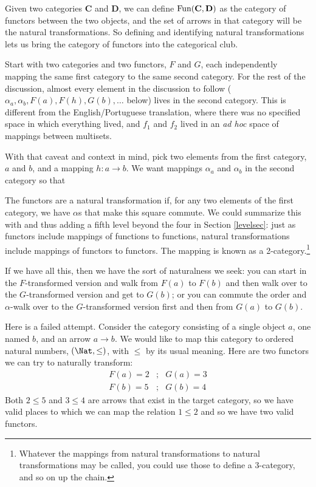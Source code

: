 \documentclass[11pt]{article}
\begin{document}
Given two categories {\bf C} and {\bf D}, we can define ${\rm Fun}({\bf C}, {\bf D})$ as
the category of functors between the two objects, and the set of arrows in that category
will be the natural transformations. So defining and identifying natural
transformations lets us bring the category of functors into the categorical club.

Start with two categories and two functors, $F$ and $G$, each independently mapping the same first
category to the same second category. For the rest of the discussion, almost every element in the discussion
to follow ($\alpha_a, \alpha_b, F(a), F(h), G(b), \dots$ below) lives in the second category.
This is different from the English/Portuguese translation, where there was no specified
space in which everything lived, and $f_1$ and $f_2$ lived in an {\em ad hoc} space of
mappings between multisets.

With that caveat and context in mind, pick two elements from the first category, $a$
and $b$, and a mapping $h:a\to b$.  We want mappings $\alpha_a$ and $\alpha_b$ in the
second category so that


The functors are a natural transformation if, for any two elements of the first category,
we have $\alpha$s that make this square commute. We could summarize this with
and thus adding a fifth level beyond the four in Section \ref{levelsec}: just as
functors include mappings of functions to functions, natural transformations include
mappings of functors to functors. The mapping is known as a 2-category.\footnote{Whatever
the mappings from natural transformations to natural transformations may be called, you could
use those to define a 3-category, and so on up the chain.}


If we have all this, then we have the sort of naturalness we seek: you can
start in the $F$-transformed version and walk from $F(a)$ to $F(b)$ and then walk over to
the $G$-transformed version and get to $G(b)$; or you can commute the order and
$\alpha$-walk over to the $G$-transformed version first and then from $G(a)$ to $G(b)$.

Here is a failed attempt.
Consider the category consisting of a single object $a$, one named $b$, and an arrow $a\to
b$. We would like to map this category to ordered natural numbers, $(\Nat, \leq)$, with
$\leq$ by its usual meaning. Here are two functors we can try to naturally transform:
\begin{eqnarray*}
    F(a) = 2 &;& G(a) = 3\\
    F(b) = 5 &;& G(b) = 4
\end{eqnarray*} 
Both $2 \leq 5$ and $3 \leq 4$ are arrows that exist in the target category, so we have
valid places to which we can map the relation $1\leq 2$ and so we have two valid functors.
\end{document}
